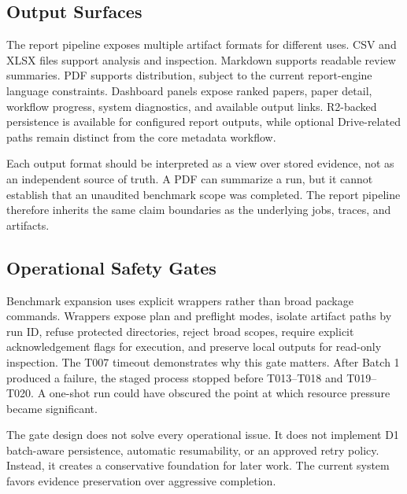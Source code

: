 \documentclass[10pt,twocolumn]{article}
\begin{document}
\subsection{Output Surfaces}
The report pipeline exposes multiple artifact formats for different uses. CSV and XLSX files support analysis and inspection. Markdown supports readable review summaries. PDF supports distribution, subject to the current report-engine language constraints. Dashboard panels expose ranked papers, paper detail, workflow progress, system diagnostics, and available output links. R2-backed persistence is available for configured report outputs, while optional Drive-related paths remain distinct from the core metadata workflow.

Each output format should be interpreted as a view over stored evidence, not as an independent source of truth. A PDF can summarize a run, but it cannot establish that an unaudited benchmark scope was completed. The report pipeline therefore inherits the same claim boundaries as the underlying jobs, traces, and artifacts.

\subsection{Operational Safety Gates}
Benchmark expansion uses explicit wrappers rather than broad package commands. Wrappers expose plan and preflight modes, isolate artifact paths by run ID, refuse protected directories, reject broad scopes, require explicit acknowledgement flags for execution, and preserve local outputs for read-only inspection. The T007 timeout demonstrates why this gate matters. After Batch 1 produced a failure, the staged process stopped before T013--T018 and T019--T020. A one-shot run could have obscured the point at which resource pressure became significant.

The gate design does not solve every operational issue. It does not implement D1 batch-aware persistence, automatic resumability, or an approved retry policy. Instead, it creates a conservative foundation for later work. The current system favors evidence preservation over aggressive completion.
\end{document}
